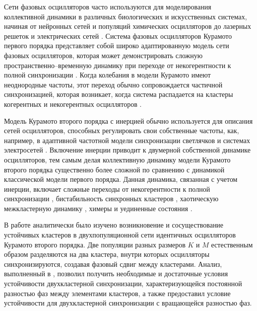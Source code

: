 Сети фазовых осцилляторов часто используются для моделирования
коллективной динамики в различных биологических и
искусственных системах, начиная от нейронных сетей \cite{Hoppensteadt:Izhikevich} и
популяций химических осцилляторов \cite{Tinsley:Nkomo} до лазерных решеток \cite{Ding:Belykh}
и электрических сетей \cite{Dorfler:Chertkov}. Система
фазовых осцилляторов Курамото первого порядка \cite{Kuramoto,Strogatz} представляет собой широко адаптированную модель
сети фазовых осцилляторов, которая может демонстрировать сложную
пространственно--временную динамику при переходе от
некогерентности к полной синхронизации \cite{Acebron:Bonilla,Barreto:Hunt,Ott:Antonsen,Hong:Chate,Pikovsky:Rosenblum,Maistrenko:Popovych,Dorfler:Bullo,Martens:Barreto}.
Когда колебания в модели Курамото имеют неоднородные частоты, этот переход обычно
сопровождается частичной синхронизацией, которая возникает, когда система
распадается на кластеры когерентных и некогерентных осцилляторов
\cite{Acebron:Bonilla,Martens:Barreto,Laing}.

Модель Курамото второго порядка с инерцией обычно используется для описания сетей осцилляторов,
способных регулировать свои собственные частоты, как, например, в адаптивной частотной
модели синхронизации светлячков \cite{Ermentrout} и системах электросетей \cite{Tumash}.
Включение инерции приводит к двумерной собственной динамике осцилляторов,
тем самым делая коллективную динамику модели Курамото второго порядка существенно более
сложной по сравнению с динамикой классической модели первого порядка.
Данная динамика, связанная с учетом инерции, включает сложные переходы от некогерентности
к полной синхронизации \cite{Tanaka:Review,Tanaka:Physica,Peron,Munyaev:Smirnov,Komarov:Gupta,Olmi:Navas,Barabash:Belykh},
бистабильность синхронных кластеров \cite{Belykh:Brister}, хаотическую межкластерную динамику \cite{Brister:Belykh},
химеры \cite{Olmi:Chaos, Maistrenko:Brezetsky, Medvedev:Mizuhara} и уединенные состояния \cite{Jaros:Maistrenko, Jaros:Brezetsky}.

В работе \cite{Belykh:Brister} аналитически было изучено возникновение и сосуществование устойчивых
кластеров в двухпопуляционной сети идентичных осцилляторов Курамото второго порядка.
Две популяции разных размеров $K$ и $M$ естественным образом разделяются на два кластера,
внутри которых осцилляторы синхронизируются, создавая фазовый сдвиг между кластерами.
Анализ, выполненный в \cite{Belykh:Brister}, позволил получить необходимые и достаточные условия устойчивости
двухкластерной синхронизации, характеризующейся постоянной разностью фаз между элементами кластеров, а
также предоставил условие устойчивости для двухкластерной синхронизации с
вращающейся разностью фаз.

